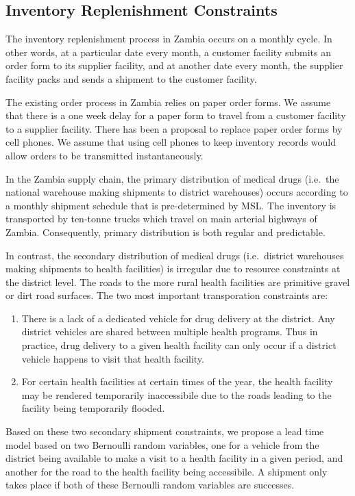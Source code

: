 \subsection{Inventory Replenishment Constraints}

The inventory replenishment process in Zambia
occurs on a monthly cycle.
In other words, at a particular date every month,
a customer facility submits an order form to its supplier facility,
and at another date every month,
the supplier facility packs and sends a shipment to the customer facility.

The existing order process in Zambia relies on paper order forms.
We assume that there is a one week delay
for a paper form to travel from a customer facility to a supplier facility.
There has been a proposal to replace paper order forms by cell phones.
We assume that using cell phones to keep inventory records
would allow orders to be transmitted instantaneously.

In the Zambia supply chain,
the primary distribution of medical drugs
(i.e.\ the national warehouse making shipments to district warehouses)
occurs according to a monthly shipment schedule that is pre-determined by MSL.
The inventory is transported by ten-tonne trucks
which travel on main arterial highways of Zambia.
Consequently, primary distribution is both regular and predictable.

In contrast,
the secondary distribution of medical drugs
(i.e.\ district warehouses making shipments to health facilities)
is irregular due to resource constraints at the district level.
The roads to the more rural health facilities
are primitive gravel or dirt road surfaces.
The two most important transporation constraints are:
\begin{enumerate}
\item
There is a lack of a dedicated vehicle for drug delivery at the district.
Any district vehicles are shared between multiple health programs.
Thus in practice, drug delivery to a given health facility
can only occur if a district vehicle happens to visit that health facility.
\item
For certain health facilities at certain times of the year,
the health facility may be rendered temporarily inaccessibile
due to the roads leading to the facility being temporarily flooded.
\end{enumerate}
Based on these two secondary shipment constraints,
we propose a lead time model based on two Bernoulli random variables,
one for a vehicle from the district being available
to make a visit to a health facility in a given period,
and another for the road to the health facility being accessibile.
A shipment only takes place if
both of these Bernoulli random variables are successes.

